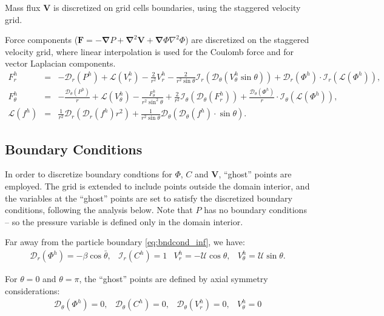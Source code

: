 \documentclass[10pt]{ijnam}
\newcommand{\pars}[1]{\left(#1\right)}
\newcommand\Laplacian{\nabla^2}
\newcommand\bnabla{\boldsymbol{\nabla}}
\newcommand\bLaplacian{\boldsymbol{\nabla}^2}
\newcommand\bV{\boldsymbol{V}}
\newcommand\bF{\boldsymbol{F}}
\newcommand\cI{\mathcal{I}}
\newcommand\cD{\mathcal{D}}
\newcommand\cL{\mathcal{L}}
\newcommand\cU{\mathscr{U}}
\begin{document}
Mass flux $\bV$ is discretized on grid cells boundaries, 
using the staggered velocity grid.

Force components ($\bF = -\bnabla P + \bLaplacian \bV + \bnabla \varPhi \Laplacian \varPhi$) 
are discretized on the staggered velocity grid, where
linear interpolation is used for the Coulomb force and for vector Laplacian components.
\begin{eqnarray}
\nonumber
F^h_r &=& -\cD_r(P^h) 
          + \cL(V^h_r) - \frac{2}{r^2} V^h_r 
		  - \frac{2}{r^2 \sin\theta} \cI_r(\cD_\theta (V^h_\theta \sin\theta))
          + \cD_r(\varPhi^h) \cdot \cI_r(\cL(\varPhi^h)), \\
F^h_\theta &=& -\frac{\cD_\theta(P^h)}{r} 
		  + \cL(V^h_\theta) - \frac{F^h_\theta}{r^2 \sin^2\theta} 
		  + \frac{2}{r^2} \cI_\theta(\cD_\theta(F^h_r))
		  + \frac{\cD_\theta(\varPhi^h)}{r} \cdot \cI_\theta(\cL(\varPhi^h)), \\
\nonumber
\cL(f^h) &=& \frac{1}{r^2}\cD_r\pars{\cD_r(f^h) r^2} + 
\frac{1}{r^2 \sin\theta} \cD_\theta\pars{\cD_\theta(f^h) \cdot \sin\theta}.
\end{eqnarray}


\subsection{Boundary Conditions} \label{sec:disc_boundary}
In order to discretize boundary condtions for $\varPhi$, $C$ and $\bV$, 
``ghost'' points are employed. 
The grid is extended to include points outside the domain interior,
and the variables at the ``ghost'' points are set to satisfy 
the discretized boundary conditions, following the analysis below.
Note that $P$ has no boundary conditions -- so the pressure variable is defined 
only in the domain interior.

Far away from the particle boundary \eqref{eq:bndcond_inf}, we have:
\begin{equation}
\begin{array}{cccc}
\cD_r \pars{\varPhi^h} = -\beta \cos\bar{\theta}, &
\cI_r \pars{C^h} = 1 &
V_r^h = -\cU \cos\theta, &
V_\theta^h = \cU \sin\theta.
\end{array}\end{equation}

For $\theta = 0$ and $\theta = \pi$, the ``ghost'' points are defined by axial 
symmetry considerations:
\begin{equation} 
\begin{array}{cccc}
\cD_\theta \pars{\varPhi^h} = 0, &
\cD_\theta \pars{C^h} = 0, &
\cD_\theta \pars{V_r^h} = 0, &
V_\theta^h = 0
\end{array}
\end{equation}
\end{document}
